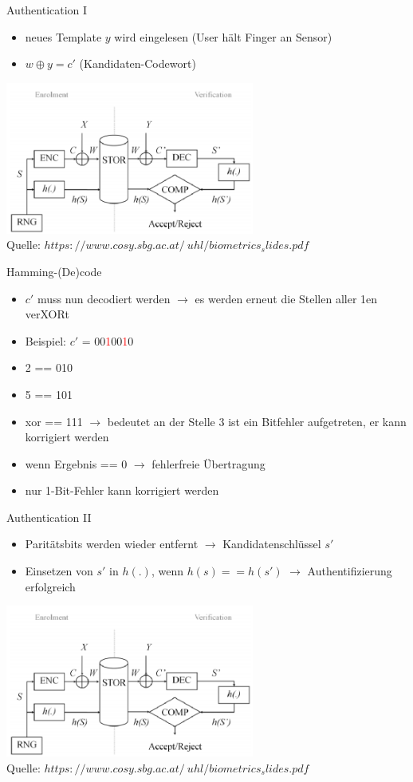 \documentclass{beamer}
\begin{document}
\begin{frame}{Authentication I}
	\begin{itemize}
		\item neues Template $y$ wird eingelesen (User hält Finger an Sensor)
		\item $w \oplus y = c'$ (Kandidaten-Codewort)
	\end{itemize}
	\hspace{10mm}\includegraphics[height=5cm]{fcs.png}\\
	\tiny{Quelle: \textit{\tiny{$https://www.cosy.sbg.ac.at/~uhl/biometrics_slides.pdf$}}}
\end{frame}
\begin{frame}{Hamming-(De)code}
	\begin{itemize}
		\item $c'$ muss nun decodiert werden $\rightarrow$ es werden erneut die Stellen aller 1en verXORt
		\item Beispiel: $c'$ = 00\textcolor{red}{1}00\textcolor{red}{1}0
		\item 2 == 010
		\item 5 == 101
		\item xor == 111 $\rightarrow$ bedeutet an der Stelle 3 ist ein Bitfehler aufgetreten, er kann korrigiert werden
		\item wenn Ergebnis == 0 $\rightarrow$ fehlerfreie Übertragung
		\item nur 1-Bit-Fehler kann korrigiert werden
	\end{itemize}
\end{frame}
\begin{frame}{Authentication II}
	\begin{itemize}
		\item Parit\"atsbits werden wieder entfernt $\rightarrow$ Kandidatenschl\"ussel $s'$
		\item Einsetzen von $s'$ in $h(.)$, wenn $h(s) == h(s')$ $\rightarrow$ Authentifizierung erfolgreich
	\end{itemize}
	\hspace{10mm}\includegraphics[height=5cm]{fcs.png}\\
	\tiny{Quelle: \textit{\tiny{$https://www.cosy.sbg.ac.at/~uhl/biometrics_slides.pdf$}}}
\end{frame}
\end{document}

